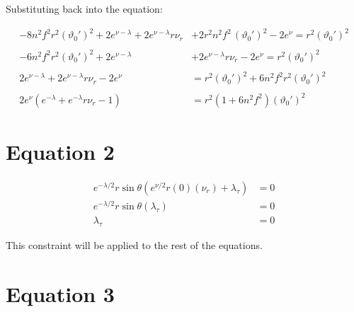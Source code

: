 \documentclass[12pt]{article}
\begin{document}
Substituting back into the equation:

\begin{align}
  -8 n^2 f^2 r^2 (\vartheta_0')^2 + 2e^{\nu - \lambda} + 2e^{\nu - \lambda}r \nu_r &+ 2 r^2 n^2 f^2 \, (\vartheta_0')^2 - 2e^{\nu} = r^2 (\vartheta_0')^2 \nonumber \\ \nonumber \\
  -6 n^2 f^2 r^2 (\vartheta_0')^2 + 2e^{\nu - \lambda} &+ 2e^{\nu - \lambda}r \nu_r - 2e^{\nu} = r^2 (\vartheta_0')^2 \nonumber \\ \nonumber \\
  2e^{\nu - \lambda} + 2e^{\nu - \lambda}r \nu_r - 2e^{\nu} &= r^2 (\vartheta_0')^2 + 6 n^2 f^2 r^2 (\vartheta_0')^2 \nonumber \\ \nonumber \\
  2e^{\nu} \left(e^{-\lambda} + e^{-\lambda}r \nu_r - 1\right) &= r^2  \left(1 + 6 n^2 f^2\right)(\vartheta_0')^2
\end{align}

\section*{Equation 2}

\begin{align}
  e^{-\lambda/2} r \sin\theta \left(e^{\nu/2}r(0)(\nu_r) + \lambda_\tau \right) &= 0 \nonumber \\
  e^{-\lambda/2} r \sin\theta (\lambda_\tau) &= 0 \nonumber \\
  \lambda_\tau &= 0
\end{align}

This constraint will be applied to the rest of the equations.

\section*{Equation 3}
\end{document}
